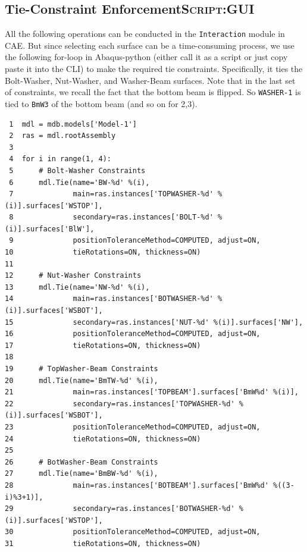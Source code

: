 \documentclass[11pt]{article}
\begin{document}
\subsection{Tie-Constraint Enforcement\hfill{}\textsc{Script:GUI}}
\label{sec:orgc600d67}
All the following operations can be conducted in the \texttt{Interaction} module in CAE.
But since selecting each surface can be a time-consuming process, we use the following for-loop in Abaqus-python (either call it as a script or just copy paste it into the CLI) to make the required tie constraints.
Specifically, it ties the Bolt-Washer, Nut-Washer, and Washer-Beam surfaces.
Note that in the last set of constraints, we recall the fact that the bottom beam is flipped.
So \texttt{WASHER-1} is tied to \texttt{BmW3} of the bottom beam (and so on for 2,3).
\begin{verbatim}
 1  mdl = mdb.models['Model-1']
 2  ras = mdl.rootAssembly
 3  
 4  for i in range(1, 4):
 5      # Bolt-Washer Constraints
 6      mdl.Tie(name='BW-%d' %(i),
 7              main=ras.instances['TOPWASHER-%d' %(i)].surfaces['WSTOP'],
 8              secondary=ras.instances['BOLT-%d' %(i)].surfaces['BlW'],
 9              positionToleranceMethod=COMPUTED, adjust=ON,
10              tieRotations=ON, thickness=ON)
11  
12      # Nut-Washer Constraints
13      mdl.Tie(name='NW-%d' %(i),
14              main=ras.instances['BOTWASHER-%d' %(i)].surfaces['WSBOT'],
15              secondary=ras.instances['NUT-%d' %(i)].surfaces['NW'],
16              positionToleranceMethod=COMPUTED, adjust=ON,
17              tieRotations=ON, thickness=ON)
18  
19      # TopWasher-Beam Constraints
20      mdl.Tie(name='BmTW-%d' %(i),
21              main=ras.instances['TOPBEAM'].surfaces['BmW%d' %(i)],
22              secondary=ras.instances['TOPWASHER-%d' %(i)].surfaces['WSBOT'],
23              positionToleranceMethod=COMPUTED, adjust=ON,
24              tieRotations=ON, thickness=ON)
25  
26      # BotWasher-Beam Constraints
27      mdl.Tie(name='BmBW-%d' %(i),
28              main=ras.instances['BOTBEAM'].surfaces['BmW%d' %((3-i)%3+1)],
29              secondary=ras.instances['BOTWASHER-%d' %(i)].surfaces['WSTOP'],
30              positionToleranceMethod=COMPUTED, adjust=ON,
31              tieRotations=ON, thickness=ON)
\end{verbatim}
\end{document}
